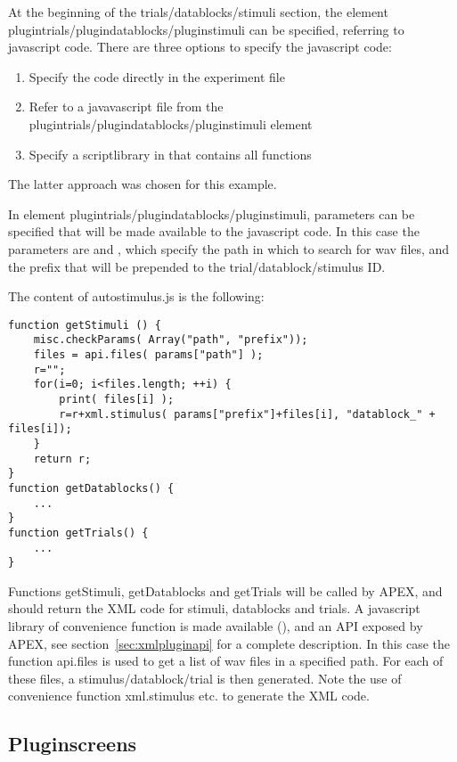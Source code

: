 At the beginning of the trials/datablocks/stimuli section, the element plugintrials/plugindatablocks/pluginstimuli can be specified, referring to javascript code. There are three options to specify the javascript code:
\begin{enumerate}
\item Specify the code directly in the experiment file
\item Refer to a javavascript file from the plugintrials/plugindatablocks/pluginstimuli element
\item Specify a scriptlibrary in  that contains all functions
\end{enumerate}
The latter approach was chosen for this example.

In element plugintrials/plugindatablocks/pluginstimuli, parameters can be specified that will be made available to the javascript code. In this case the parameters are  and , which specify the path in which to search for wav files, and the prefix that will be prepended to the trial/datablock/stimulus ID.

The content of autostimulus.js is the following:

\begin{lstlisting}
function getStimuli () {
    misc.checkParams( Array("path", "prefix"));
    files = api.files( params["path"] );
    r="";
    for(i=0; i<files.length; ++i) {
        print( files[i] );
        r=r+xml.stimulus( params["prefix"]+files[i], "datablock_" + files[i]);
    }
    return r;
}
function getDatablocks() {
	...
}
function getTrials() {
	...
}
\end{lstlisting}

Functions getStimuli, getDatablocks and getTrials will be called by APEX, and should return the XML code for stimuli, datablocks and trials. A javascript library of convenience function is made available (), and an API exposed by APEX, see section~\ref{sec:xmlpluginapi} for a complete description. In this case the function api.files is used to get a list of wav files in a specified path. For each of these files, a stimulus/datablock/trial is then generated. Note the use of convenience function xml.stimulus etc. to generate the XML code.


\subsection{Pluginscreens}

